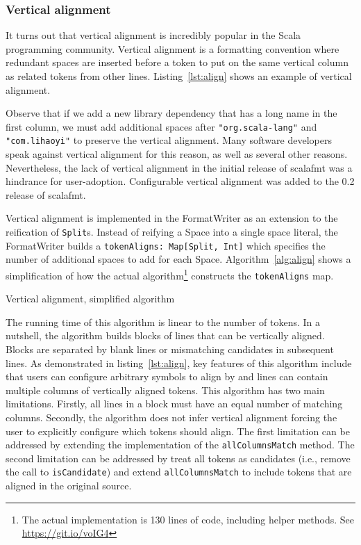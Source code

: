 \subsubsection{Vertical alignment}
It turns out that vertical alignment is incredibly popular in the Scala programming community.
Vertical alignment is a formatting convention where redundant spaces are inserted before a token to put on the same vertical column as related tokens from other lines.
Listing~\ref{lst:align} shows an example of vertical alignment.

Observe that if we add a new library dependency that has a long name in the first column, we must add additional spaces after \texttt{"org.scala-lang"} and \texttt{"com.lihaoyi"} to preserve the vertical alignment.
Many software developers speak against vertical alignment for this reason, as well as several other reasons.
Nevertheless, the lack of vertical alignment in the initial release of scalafmt was a hindrance for user-adoption.
Configurable vertical alignment was added to the 0.2 release of scalafmt.

Vertical alignment is implemented in the FormatWriter as an extension to the reification of \texttt{Split}s.
Instead of reifying a Space into a single space literal,
the FormatWriter builds a \texttt{tokenAligns: Map[Split, Int]} which specifies the number of additional spaces to add for each Space.
Algorithm~\ref{alg:align} shows a simplification of how the actual algorithm\footnote{
  The actual implementation is 130 lines of code, including helper methods. See
\href{https://git.io/voIG4}{https://git.io/voIG4}}
constructs the \texttt{tokenAligns} map.
\begin{algorithm}
  \caption{Vertical alignment, simplified algorithm}\label{alg:align}
  
\end{algorithm}
The running time of this algorithm is linear to the number of tokens.
In a nutshell, the algorithm builds blocks of lines that can be vertically aligned.
Blocks are separated by blank lines or mismatching candidates in subsequent lines.
As demonstrated in listing~\ref{lst:align}, key features of this algorithm include that users can configure arbitrary symbols to align by and lines can contain multiple columns of vertically aligned tokens.
This algorithm has two main limitations.
Firstly, all lines in a block must have an equal number of matching columns.
Secondly, the algorithm does not infer vertical alignment forcing the user to explicitly configure which tokens should align.
The first limitation can be addressed by extending the implementation of the \texttt{allColumnsMatch} method.
The second limitation can be addressed by treat all tokens as candidates (i.e., remove the call to \texttt{isCandidate}) and extend \texttt{allColumnsMatch} to include tokens that are aligned in the original source.

